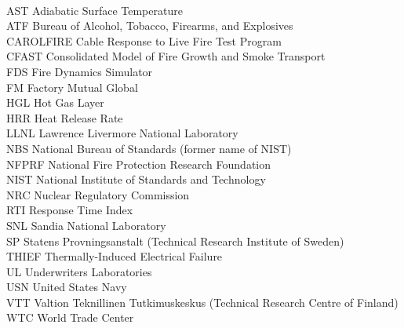 \documentclass[11pt]{book}
\begin{document}
\begin{tabbing}
\hspace{1.5in} \= \\
AST \> Adiabatic Surface Temperature \\
ATF \> Bureau of Alcohol, Tobacco, Firearms, and Explosives \\
CAROLFIRE \> Cable Response to Live Fire Test Program \\
CFAST \> Consolidated Model of Fire Growth and Smoke Transport \\
FDS \> Fire Dynamics Simulator \\
FM \> Factory Mutual Global \\
HGL \> Hot Gas Layer \\
HRR \> Heat Release Rate \\
LLNL \> Lawrence Livermore National Laboratory \\
NBS \> National Bureau of Standards (former name of NIST) \\
NFPRF \> National Fire Protection Research Foundation \\
NIST \> National Institute of Standards and Technology \\
NRC \> Nuclear Regulatory Commission \\
RTI \> Response Time Index \\
SNL \> Sandia National Laboratory \\
SP \>  Statens Provningsanstalt (Technical Research Institute of Sweden) \\
THIEF \> Thermally-Induced Electrical Failure \\
UL  \> Underwriters Laboratories \\
USN \> United States Navy \\
VTT \> Valtion Teknillinen Tutkimuskeskus (Technical Research Centre of Finland) \\
WTC \> World Trade Center \\
\end{tabbing}

\mainmatter





















\nopart %
\printbibliography[heading=bibintoc,title={References}]

\appendix


\end{document}
